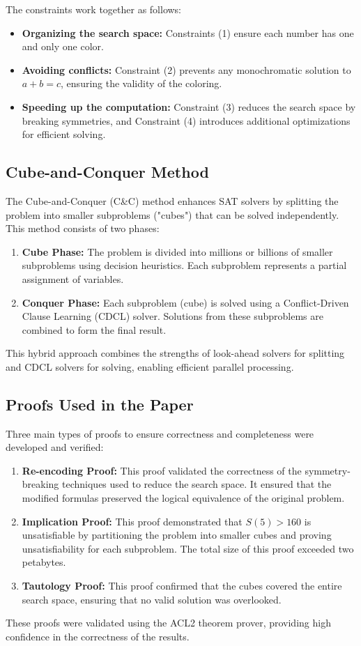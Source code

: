 \documentclass[12pt]{article}
\begin{document}
The constraints work together as follows:
\begin{itemize}
    \item \textbf{Organizing the search space:} Constraints (1) ensure each number has one and only one color.
    \item \textbf{Avoiding conflicts:} Constraint (2) prevents any monochromatic solution to \( a + b = c \), ensuring the validity of the coloring.
    \item \textbf{Speeding up the computation:} Constraint (3) reduces the search space by breaking symmetries, and Constraint (4) introduces additional optimizations for efficient solving.
\end{itemize}

\subsection{Cube-and-Conquer Method}
The Cube-and-Conquer (C\&C) method enhances SAT solvers by splitting the problem into smaller subproblems ("cubes") that can be solved independently. This method consists of two phases:
\begin{enumerate}
    \item \textbf{Cube Phase:} The problem is divided into millions or billions of smaller subproblems using decision heuristics. Each subproblem represents a partial assignment of variables.
    \item \textbf{Conquer Phase:} Each subproblem (cube) is solved using a Conflict-Driven Clause Learning (CDCL) solver. Solutions from these subproblems are combined to form the final result.
\end{enumerate}

This hybrid approach combines the strengths of look-ahead solvers for splitting and CDCL solvers for solving, enabling efficient parallel processing.

\subsection{Proofs Used in the Paper}
Three main types of proofs to ensure correctness and completeness were developed and verified: 
\begin{enumerate}
    \item \textbf{Re-encoding Proof:} This proof validated the correctness of the symmetry-breaking techniques used to reduce the search space. It ensured that the modified formulas preserved the logical equivalence of the original problem.

    \item \textbf{Implication Proof:} This proof demonstrated that \( S(5) > 160 \) is unsatisfiable by partitioning the problem into smaller cubes and proving unsatisfiability for each subproblem. The total size of this proof exceeded two petabytes.

    \item \textbf{Tautology Proof:} This proof confirmed that the cubes covered the entire search space, ensuring that no valid solution was overlooked.
\end{enumerate}
These proofs were validated using the ACL2 theorem prover, providing high confidence in the correctness of the results.
\end{document}
